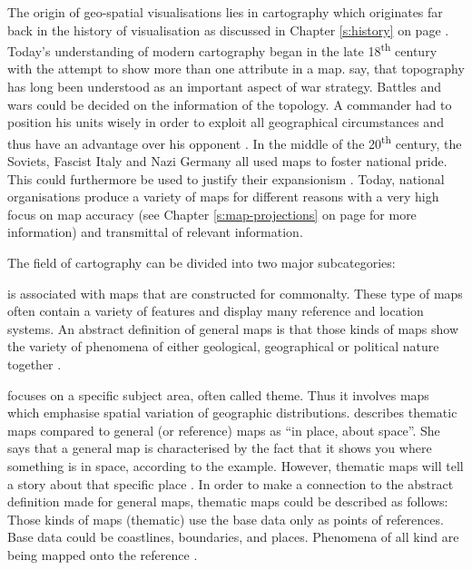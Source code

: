 The origin of geo-spatial visualisations lies in cartography which originates far back in the history of visualisation as discussed in Chapter \ref{s:history} on page \pageref{s:history}. Today's understanding of modern cartography began in the late 18\textsuperscript{th} century with the attempt to show more than one attribute in a map. \citeauthor{Longley2005} say, that topography has long been understood as an important aspect of war strategy. Battles and wars could be decided on the information of the topology. A commander had to position his units wisely in order to exploit all geographical circumstances and thus have an advantage over his opponent .
In the middle of the 20\textsuperscript{th} century, the Soviets, Fascist Italy and Nazi Germany all used maps to foster national pride. This could furthermore be used to justify their expansionism .
Today, national organisations produce a variety of maps for different reasons with a very high focus on map accuracy (see Chapter \ref{s:map-projections} on page \pageref{s:map-projections} for more information) and transmittal of relevant information.

The field of cartography can be divided into two major subcategories:
\begin{enumerate}
 is associated with maps that are constructed for commonalty. These type of maps often contain a variety of features and display many reference and location systems. An abstract definition of general maps is that those kinds of maps show the variety of phenomena of either geological, geographical or political nature together .

 focuses on a specific subject area, often called theme. Thus it involves maps which emphasise spatial variation of geographic distributions. \citeauthor{BartzPetchenik1979} describes thematic maps compared to general (or reference) maps as ``in place, about space''. She says that a general map is characterised by the fact that it shows you where something is in space, according to the example. However, thematic maps will tell a story about that specific place .
In order to make a connection to the abstract definition \citeauthor{Thrower2008} made for general maps, thematic maps could be described as follows:
Those kinds of maps (thematic) use the base data only as points of references. Base data could be coastlines, boundaries, and places. Phenomena of all kind are being mapped onto the reference .
\end{enumerate}

